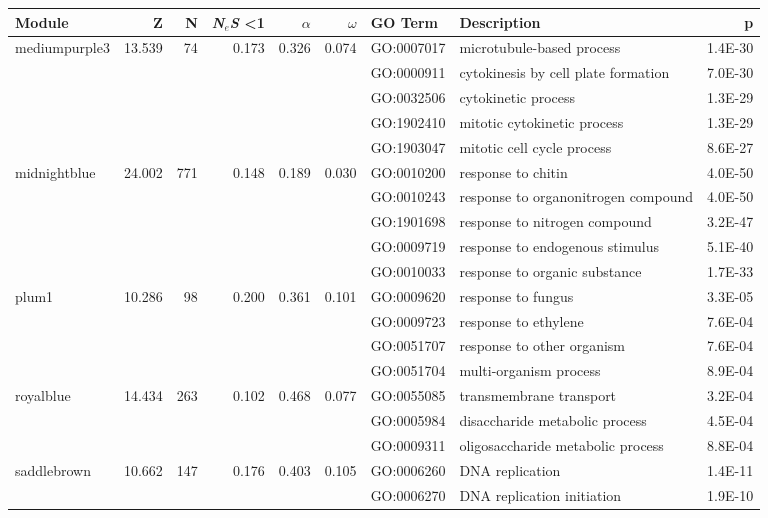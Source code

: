 \begin{landscape}
\begin{table}[ht]
\centering
\begin{tabular}{lrrrrrlP{5cm}r}
  \hline
Module & Z & N & \textit{N$_{e}$S} \textless 1& $\alpha$ & $\omega$ & GO Term & Description & p \\ 
  \hline

 mediumpurple3 & 13.539 & 74 & 0.173 & 0.326 & 0.074 & GO:0007017 & microtubule-based process & 1.4E-30 \\ 
   &  &  &  &  &  & GO:0000911 & cytokinesis by cell plate formation & 7.0E-30 \\ 
   &  &  &  &  &  & GO:0032506 & cytokinetic process & 1.3E-29 \\ 
   &  &  &  &  &  & GO:1902410 & mitotic cytokinetic process & 1.3E-29 \\ 
   &  &  &  &  &  & GO:1903047 & mitotic cell cycle process & 8.6E-27 \\ 
\hline
  midnightblue & 24.002 & 771 & 0.148 & 0.189 & 0.030 & GO:0010200 & response to chitin & 4.0E-50 \\ 
   &  &  &  &  &  & GO:0010243 & response to organonitrogen compound & 4.0E-50 \\ 
   &  &  &  &  &  & GO:1901698 & response to nitrogen compound & 3.2E-47 \\ 
   &  &  &  &  &  & GO:0009719 & response to endogenous stimulus & 5.1E-40 \\ 
   &  &  &  &  &  & GO:0010033 & response to organic substance & 1.7E-33 \\ 
\hline 
 plum1 & 10.286 & 98 & 0.200 & 0.361 & 0.101 & GO:0009620 & response to fungus & 3.3E-05 \\ 
   &  &  &  &  &  & GO:0009723 & response to ethylene & 7.6E-04 \\ 
   &  &  &  &  &  & GO:0051707 & response to other organism & 7.6E-04 \\ 
   &  &  &  &  &  & GO:0051704 & multi-organism process & 8.9E-04 \\ 
\hline  
royalblue & 14.434 & 263 & 0.102 & 0.468 & 0.077 & GO:0055085 & transmembrane transport & 3.2E-04 \\ 
   &  &  &  &  &  & GO:0005984 & disaccharide metabolic process & 4.5E-04 \\ 
   &  &  &  &  &  & GO:0009311 & oligosaccharide metabolic process & 8.8E-04 \\ 
\hline 
 saddlebrown & 10.662 & 147 & 0.176 & 0.403 & 0.105 & GO:0006260 & DNA replication & 1.4E-11 \\ 
   &  &  &  &  &  & GO:0006270 & DNA replication initiation & 1.9E-10 \\ 

\end{tabular}
\end{table}
\end{landscape}
